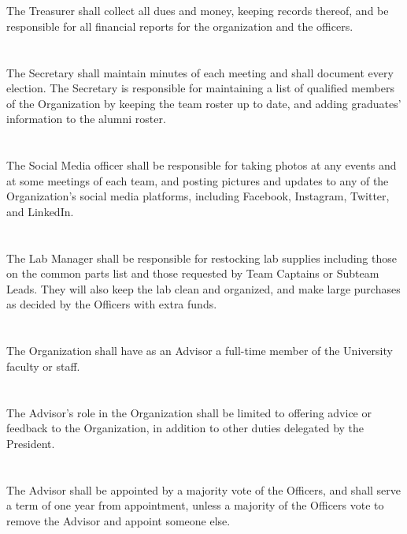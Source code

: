 \documentclass[12pt]{cls/constitution}
\begin{document}
\section{}
The Treasurer shall collect all dues and money, keeping records thereof, and be responsible for all financial reports for the organization and the officers.

\section{}
The Secretary shall maintain minutes of each meeting and shall document every election. The Secretary is responsible for maintaining a list of qualified members of the Organization by keeping the team roster up to date, and adding graduates' information to the alumni roster.

\section{}
The Social Media officer shall be responsible for taking photos at any events and at some meetings of each team, and posting pictures and updates to any of the Organization's social media platforms, including Facebook, Instagram, Twitter, and LinkedIn.

\section{}
The Lab Manager shall be responsible for restocking lab supplies including those on the common parts list and those requested by Team Captains or Subteam Leads. They will also keep the lab clean and organized, and make large purchases as decided by the Officers with extra funds. 

\section{}
The Organization shall have as an Advisor a full-time member of the University faculty or staff.

\section{}
The Advisor’s role in the Organization shall be limited to offering advice or feedback to the Organization, in addition to other duties delegated by the President.

\section{}
The Advisor shall be appointed by a majority vote of the Officers, and shall serve a term of one year from appointment, unless a majority of the Officers vote to remove the Advisor and appoint someone else. 
\end{document}
